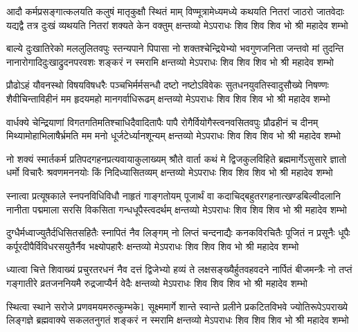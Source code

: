 
\fourlineindentedshloka
{आदौ कर्मप्रसङ्गात्कलयति कलुषं मातृकुक्षौ स्थितं माम्}
{विण्मूत्रामेध्यमध्ये कथयति नितरां जाठरो जातवेदाः}
{यद्यद्वै तत्र दुःखं व्यथयति नितरां शक्यते केन वक्तुम्}
{क्षन्तव्यो मेऽपराधः शिव शिव शिव भो श्री महादेव शम्भो} %

\fourlineindentedshloka
{बाल्ये दुःखातिरेको मललुलितवपुः स्तन्यपाने पिपासा}
{नो शक्तश्चेन्द्रियेभ्यो भवगुणजनिता जन्तवो मां तुदन्ति}
{नानारोगादिदुःखाद्रुदनपरवशः शङ्करं न स्मरामि}
{क्षन्तव्यो मेऽपराधः शिव शिव शिव भो श्री महादेव शम्भो} %

\fourlineindentedshloka
{प्रौढोऽहं यौवनस्थो विषयविषधरैः पञ्चभिर्मर्मसन्धौ}
{दष्टो नष्टोऽविवेकः सुतधनयुवतिस्वादुसौख्ये निषण्णः}
{शैवीचिन्ताविहीनं मम हृदयमहो मानगर्वाधिरूढम्}
{क्षन्तव्यो मेऽपराधः शिव शिव शिव भो श्री महादेव शम्भो} %

\fourlineindentedshloka
{वार्धक्ये चेन्द्रियाणां विगतगतिमतिश्चाधिदैवादितापैः}
{पापै रोगैर्वियोगैस्त्वनवसितवपुः प्रौढहीनं च दीनम्}
{मिथ्यामोहाभिलाषैर्भ्रमति मम मनो धूर्जटेर्ध्यानशून्यम्}
{क्षन्तव्यो मेऽपराधः शिव शिव शिव भो श्री महादेव शम्भो} %

\fourlineindentedshloka
{नो शक्यं स्मार्तकर्म प्रतिपदगहनप्रत्यवायाकुलाख्यम्}
{श्रौते वार्ता कथं मे द्विजकुलविहिते ब्रह्ममार्गेऽसुसारे}
{ज्ञातो धर्मो विचारैः श्रवणमननयोः किं निदिध्यासितव्यम्}
{क्षन्तव्यो मेऽपराधः शिव शिव शिव भो श्री महादेव शम्भो} %

\fourlineindentedshloka
{स्नात्वा प्रत्यूषकाले स्नपनविधिविधौ नाहृतं गाङ्गतोयम्}
{पूजार्थं वा कदाचिद्बहुतरगहनात्खण्डबिल्वीदलानि}
{नानीता पद्ममाला सरसि विकसिता गन्धधूपैस्त्वदर्थम्}
{क्षन्तव्यो मेऽपराधः शिव शिव शिव भो श्री महादेव शम्भो} %

\fourlineindentedshloka
{दुग्धैर्मध्वाज्युतैर्दधिसितसहितैः स्नापितं नैव लिङ्गम्}
{नो लिप्तं चन्दनाद्यैः कनकविरचितैः पूजितं न प्रसूनैः}
{धूपैः कर्पूरदीपैर्विविधरसयुतैर्नैव भक्ष्योपहारैः}
{क्षन्तव्यो मेऽपराधः शिव शिव शिव भो श्री महादेव शम्भो} %

\fourlineindentedshloka
{ध्यात्वा चित्ते शिवाख्यं प्रचुरतरधनं नैव दत्तं द्विजेभ्यो}
{हव्यं ते लक्षसङ्ख्यैर्हुतवहवदने नार्पितं बीजमन्त्रैः}
{नो तप्तं गङ्गातीरे व्रतजननियमै रुद्रजाप्यैर्न वेदैः}
{क्षन्तव्यो मेऽपराधः शिव शिव शिव भो श्री महादेव शम्भो} %

\fourlineindentedshloka
{स्थित्वा स्थाने सरोजे प्रणवमयमरुत्कुम्भके1 सूक्ष्ममार्गे}
{शान्ते स्वान्ते प्रलीने प्रकटितविभवे ज्योतिरूपेऽपराख्ये}
{लिङ्गज्ञे ब्रह्मवाक्ये सकलतनुगतं शङ्करं न स्मरामि}
{क्षन्तव्यो मेऽपराधः शिव शिव शिव भो श्री महादेव शम्भो} %


